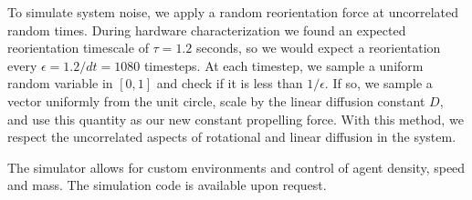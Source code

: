 \documentclass[runningheads]{llncs}
\begin{document}
To simulate system noise, we apply a random reorientation force at uncorrelated random times. During hardware characterization we found an expected reorientation timescale of $\tau=1.2$ seconds, so we would expect a reorientation every $\epsilon = 1.2/dt = 1080$ timesteps. At each timestep, we sample a uniform random variable in $[0,1]$ and check if it is less than $1/\epsilon$. If so, we sample a vector uniformly from the unit circle, scale by the linear diffusion constant $D$, and use this quantity as our new constant propelling force. With this method, we respect the uncorrelated aspects of rotational and linear diffusion in the system.%

The simulator allows for custom environments and control of agent density, speed and mass. The simulation code is available upon request.



 
\end{document}
